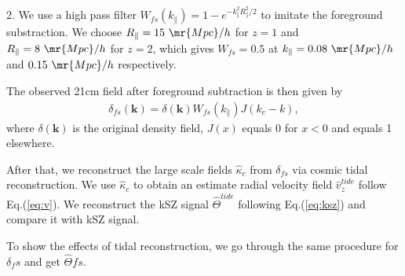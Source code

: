 2. We use a high pass filter $W_{fs}(k_\parallel)=1-e^{-k_\parallel^2R_\parallel^2/2}$ to imitate the foreground substraction. 
We choose 
$R_\parallel=15\ \mr{Mpc}/h$ for $z=1$ and $R_\parallel=8\ \mr{Mpc}/h$ for $z=2$, which gives
$W_{fs}=0.5$ at
$k_\parallel=0.08\ \mr{Mpc}/h$ and $0.15\ \mr{Mpc}/h$ respectively. 

The observed 21cm field after foreground subtraction is then given by 
\begin{eqnarray}
\label{eq:fs}
\delta_{fs}(\bm{k})=\delta(\bm{k})W_{fs}(k_\parallel)J(k_c-k),
\end{eqnarray}
where $\delta(\bm{k})$ is the original density field, 
$J(x)$ equals 0 for $x<0$ and equals 1 elsewhere.

After that, we reconstruct the large scale fields $\hat \kappa_c$ from $\delta_{fs}$ via
cosmic tidal reconstruction. 
We use $\hat \kappa_c$ to obtain an estimate radial velocity field $\hat v_z^{tide}$ follow Eq.(\ref{eq:v}).
We reconstruct the kSZ signal $\hat \Theta^{tide}$ following Eq.(\ref{eq:ksz}) and compare it with kSZ signal.

To show the effects of tidal reconstruction, we go through the same procedure for $\delta_fs$ and get $\hat \Theta{fs}$. 
